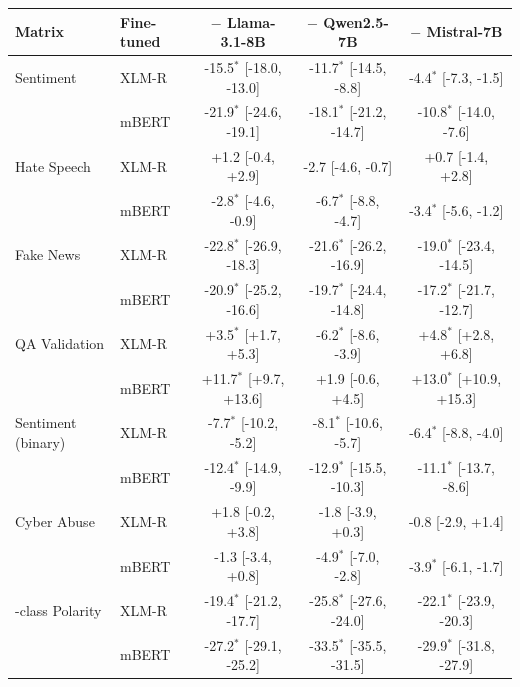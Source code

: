 \begin{tabular}{llccc}
\toprule
Matrix & Fine-tuned & $-$ Llama-3.1-8B & $-$ Qwen2.5-7B & $-$ Mistral-7B \\
\midrule
Sentiment & XLM-R & -15.5$^{*}$ [-18.0, -13.0] & -11.7$^{*}$ [-14.5, -8.8] & -4.4$^{*}$ [-7.3, -1.5] \\
 & mBERT & -21.9$^{*}$ [-24.6, -19.1] & -18.1$^{*}$ [-21.2, -14.7] & -10.8$^{*}$ [-14.0, -7.6] \\\addlinespace[2pt]
Hate Speech & XLM-R & +1.2 [-0.4, +2.9] & -2.7 [-4.6, -0.7] & +0.7 [-1.4, +2.8] \\
 & mBERT & -2.8$^{*}$ [-4.6, -0.9] & -6.7$^{*}$ [-8.8, -4.7] & -3.4$^{*}$ [-5.6, -1.2] \\\addlinespace[2pt]
Fake News & XLM-R & -22.8$^{*}$ [-26.9, -18.3] & -21.6$^{*}$ [-26.2, -16.9] & -19.0$^{*}$ [-23.4, -14.5] \\
 & mBERT & -20.9$^{*}$ [-25.2, -16.6] & -19.7$^{*}$ [-24.4, -14.8] & -17.2$^{*}$ [-21.7, -12.7] \\\addlinespace[2pt]
QA Validation & XLM-R & +3.5$^{*}$ [+1.7, +5.3] & -6.2$^{*}$ [-8.6, -3.9] & +4.8$^{*}$ [+2.8, +6.8] \\
 & mBERT & +11.7$^{*}$ [+9.7, +13.6] & +1.9 [-0.6, +4.5] & +13.0$^{*}$ [+10.9, +15.3] \\\addlinespace[2pt]
Sentiment (binary) & XLM-R & -7.7$^{*}$ [-10.2, -5.2] & -8.1$^{*}$ [-10.6, -5.7] & -6.4$^{*}$ [-8.8, -4.0] \\
 & mBERT & -12.4$^{*}$ [-14.9, -9.9] & -12.9$^{*}$ [-15.5, -10.3] & -11.1$^{*}$ [-13.7, -8.6] \\\addlinespace[2pt]
Cyber Abuse & XLM-R & +1.8 [-0.2, +3.8] & -1.8 [-3.9, +0.3] & -0.8 [-2.9, +1.4] \\
 & mBERT & -1.3 [-3.4, +0.8] & -4.9$^{*}$ [-7.0, -2.8] & -3.9$^{*}$ [-6.1, -1.7] \\\addlinespace[2pt]
3-class Polarity & XLM-R & -19.4$^{*}$ [-21.2, -17.7] & -25.8$^{*}$ [-27.6, -24.0] & -22.1$^{*}$ [-23.9, -20.3] \\
 & mBERT & -27.2$^{*}$ [-29.1, -25.2] & -33.5$^{*}$ [-35.5, -31.5] & -29.9$^{*}$ [-31.8, -27.9] \\
\bottomrule
\end{tabular}

